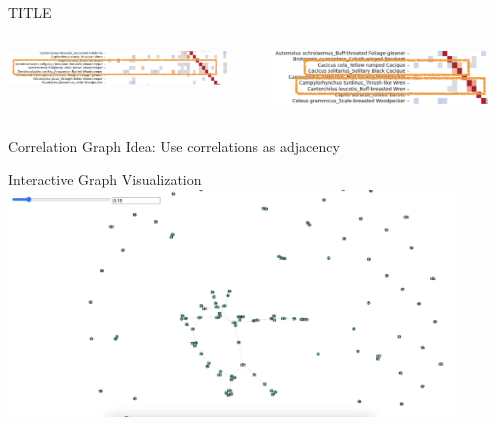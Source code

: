 \begin{frame}{TITLE}
    \begin{columns}
        \begin{column}{0.5\textwidth}
            \centering
            \includegraphics[height=0.9\textheight,width=0.9\textwidth,keepaspectratio]{images/sim1.png}   
        \end{column}
        \begin{column}{0.5\textwidth}
            \centering
            \includegraphics[height=0.9\textheight,width=0.9\textwidth,keepaspectratio]{images/sim2.png} 
        \end{column}
    \end{columns}
\end{frame}

\begin{frame}{Correlation Graph}
    \centering Idea: Use correlations as adjacency
\end{frame}

\begin{frame}{Interactive Graph Visualization}
    \includegraphics[height=0.9\textheight, width=0.9\textwidth]{images/asid_corr_graphvis.png}
\end{frame}

